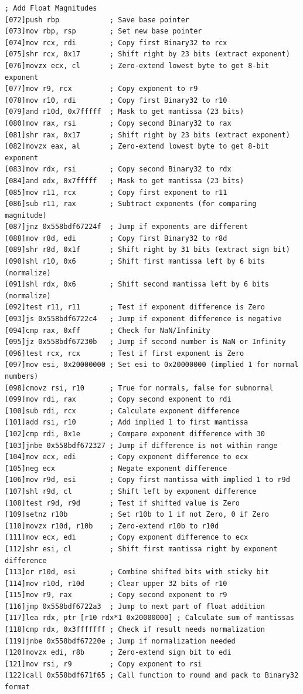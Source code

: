 \documentclass[12pt,letter]{article}
\begin{document}
\begin{lstlisting}[style=rust, caption={Annotated IEE-754 Binary32 Normal Subtraction ASM Trace}, label={fig:ieee_subtract}]
; Add Float Magnitudes
[072]push rbp            ; Save base pointer
[073]mov rbp, rsp        ; Set new base pointer
[074]mov rcx, rdi        ; Copy first Binary32 to rcx
[075]shr rcx, 0x17       ; Shift right by 23 bits (extract exponent)
[076]movzx ecx, cl       ; Zero-extend lowest byte to get 8-bit exponent
[077]mov r9, rcx         ; Copy exponent to r9
[078]mov r10, rdi        ; Copy first Binary32 to r10
[079]and r10d, 0x7fffff  ; Mask to get mantissa (23 bits)
[080]mov rax, rsi        ; Copy second Binary32 to rax
[081]shr rax, 0x17       ; Shift right by 23 bits (extract exponent)
[082]movzx eax, al       ; Zero-extend lowest byte to get 8-bit exponent
[083]mov rdx, rsi        ; Copy second Binary32 to rdx
[084]and edx, 0x7fffff   ; Mask to get mantissa (23 bits)
[085]mov r11, rcx        ; Copy first exponent to r11
[086]sub r11, rax        ; Subtract exponents (for comparing magnitude)
[087]jnz 0x558bdf67224f  ; Jump if exponents are different
[088]mov r8d, edi        ; Copy first Binary32 to r8d
[089]shr r8d, 0x1f       ; Shift right by 31 bits (extract sign bit)
[090]shl r10, 0x6        ; Shift first mantissa left by 6 bits (normalize)
[091]shl rdx, 0x6        ; Shift second mantissa left by 6 bits (normalize)
[092]test r11, r11       ; Test if exponent difference is Zero
[093]js 0x558bdf6722c4   ; Jump if exponent difference is negative
[094]cmp rax, 0xff       ; Check for NaN/Infinity
[095]jz 0x558bdf67230b   ; Jump if second number is NaN or Infinity
[096]test rcx, rcx       ; Test if first exponent is Zero
[097]mov esi, 0x20000000 ; Set esi to 0x20000000 (implied 1 for normal numbers)
[098]cmovz rsi, r10      ; True for normals, false for subnormal
[099]mov rdi, rax        ; Copy second exponent to rdi
[100]sub rdi, rcx        ; Calculate exponent difference
[101]add rsi, r10        ; Add implied 1 to first mantissa
[102]cmp rdi, 0x1e       ; Compare exponent difference with 30
[103]jnbe 0x558bdf672327 ; Jump if difference is not within range
[104]mov ecx, edi        ; Copy exponent difference to ecx
[105]neg ecx             ; Negate exponent difference
[106]mov r9d, esi        ; Copy first mantissa with implied 1 to r9d
[107]shl r9d, cl         ; Shift left by exponent difference
[108]test r9d, r9d       ; Test if shifted value is Zero
[109]setnz r10b          ; Set r10b to 1 if not Zero, 0 if Zero
[110]movzx r10d, r10b    ; Zero-extend r10b to r10d
[111]mov ecx, edi        ; Copy exponent difference to ecx
[112]shr esi, cl         ; Shift first mantissa right by exponent difference
[113]or r10d, esi        ; Combine shifted bits with sticky bit
[114]mov r10d, r10d      ; Clear upper 32 bits of r10
[115]mov r9, rax         ; Copy second exponent to r9
[116]jmp 0x558bdf6722a3  ; Jump to next part of float addition
[117]lea rdx, ptr [r10 rdx*1 0x20000000] ; Calculate sum of mantissas
[118]cmp rdx, 0x3fffffff ; Check if result needs normalization
[119]jnbe 0x558bdf67220e ; Jump if normalization needed
[120]movzx edi, r8b      ; Zero-extend sign bit to edi
[121]mov rsi, r9         ; Copy exponent to rsi
[122]call 0x558bdf671f65 ; Call function to round and pack to Binary32 format


\end{lstlisting}
\end{document}
